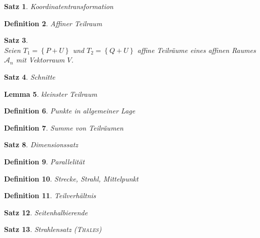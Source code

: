 \documentclass[%
a4paper,
11pt,		%
]
{scrartcl}
\theoremstyle{plain}
\newtheorem{mydef}{Definition}[section]
\theoremstyle{plain}
\newtheorem{mysatz}[mydef]{Satz}
\theoremstyle{plain}
\newtheorem{mylemma}[mydef]{Lemma}
\theoremstyle{plain}
\theoremstyle{plain}
\begin{document}
\begin{mysatz}
    Koordinatentransformation
\end{mysatz}

\begin{mydef}
    Affiner Teilraum
\end{mydef}

\begin{mysatz}
    \ \\
    Seien $T_1 = \left\{ P+U \right\}$ und $T_2 = \left\{ Q+U \right\}$ affine Teilräume eines affinen Raumes $\mathcal{A}_n$ mit Vektorraum $V$.
\end{mysatz}

\begin{mysatz}
    Schnitte
\end{mysatz}

\begin{mylemma}
    kleinster Teilraum
\end{mylemma}

\begin{mydef}
    Punkte in allgemeiner Lage
\end{mydef}

\begin{mydef}
    Summe von Teilräumen
\end{mydef}

\begin{mysatz}
    Dimensionssatz
\end{mysatz}

\begin{mydef}
    Parallelität
\end{mydef}

\begin{mydef}
    Strecke, Strahl, Mittelpunkt
\end{mydef}

\begin{mydef}
    Teilverhältnis
\end{mydef}

\begin{mysatz}
    Seitenhalbierende
\end{mysatz}

\begin{mysatz}
    Strahlensatz (\textsc{Thales})
\end{mysatz}

\newpage
\end{document}
